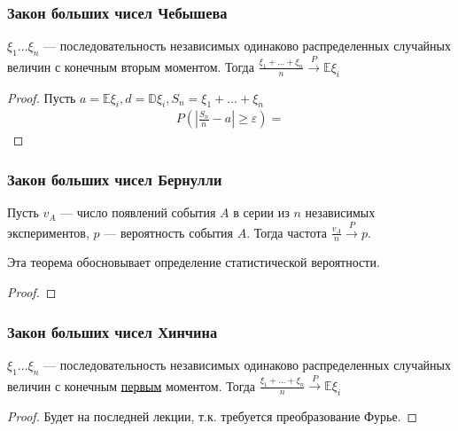 \subsubsection{Закон больших чисел Чебышева}

\begin{theorem}
    \(\xi_1 \dots \xi_n\) --- последовательность независимых одинаково распределенных случайных величин с конечным вторым моментом. Тогда \(\frac{\xi_1 + \dots + \xi_n}{n} \xrightarrow{P} \mathbb{E}\xi_i\)
\end{theorem}
\begin{proof}
    Пусть \(a = \mathbb{E}\xi_i, d = \mathbb{D}\xi_i, S_n = \xi_1 + \dots + \xi_n\)
    \begin{align*}
        P\left( \left|\frac{S_n}{n} - a\right| \geq \varepsilon \right) =
    \end{align*}
    \unfinished
\end{proof}

\subsubsection{Закон больших чисел Бернулли}

\begin{theorem}
    Пусть \(v_A\) --- число появлений события \(A\) в серии из \(n\) независимых экспериментов, \(p\) --- вероятность события \(A\). Тогда частота \(\frac{v_A}{n} \xrightarrow{P} p\).
\end{theorem}
\begin{remark}
    Эта теорема обосновывает определение статистической вероятности.
\end{remark}
\begin{proof}
    \unfinished
\end{proof}

\subsubsection{Закон больших чисел Хинчина}

\begin{theorem}
    \(\xi_1 \dots \xi_n\) --- последовательность независимых одинаково распределенных случайных величин с конечным \underline{первым} моментом. Тогда \(\frac{\xi_1 + \dots + \xi_n}{n} \xrightarrow{P} \mathbb{E}\xi_i\)
\end{theorem}
\begin{proof}
    Будет на последней лекции, т.к. требуется преобразование Фурье.
\end{proof}

